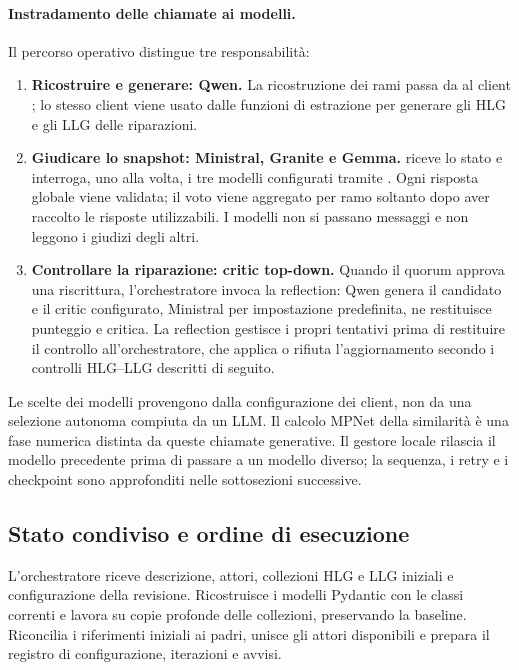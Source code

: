 \begin{samepage}
\paragraph{Instradamento delle chiamate ai modelli.}
Il percorso operativo distingue tre responsabilit\`a:
\begin{enumerate}
\item \textbf{Ricostruire e generare: Qwen.} La ricostruzione dei rami passa
da  al client
; lo stesso client viene usato dalle funzioni
di estrazione per generare gli HLG e gli LLG delle riparazioni.
\item \textbf{Giudicare lo snapshot: Ministral, Granite e Gemma.}
 riceve lo stato e interroga, uno alla
volta, i tre modelli configurati tramite .
Ogni risposta globale viene validata; il voto viene aggregato per ramo
soltanto dopo aver raccolto le risposte utilizzabili. I modelli non si
passano messaggi e non leggono i giudizi degli altri.
\item \textbf{Controllare la riparazione: critic top-down.}
Quando il quorum approva una riscrittura, l'orchestratore invoca la
reflection: Qwen genera il candidato e il critic configurato, Ministral
per impostazione predefinita, ne restituisce punteggio e critica.
La reflection gestisce i propri tentativi prima di restituire il controllo
all'orchestratore, che applica o rifiuta l'aggiornamento secondo i controlli
HLG--LLG descritti di seguito.
\end{enumerate}
\end{samepage}
Le scelte dei modelli provengono dalla configurazione dei client, non
da una selezione autonoma compiuta da un LLM. Il calcolo MPNet della
similarit\`a \`e una fase numerica distinta da queste chiamate generative.
Il gestore locale rilascia il modello precedente prima di passare a un
modello diverso; la sequenza, i retry e i checkpoint sono approfonditi
nelle sottosezioni successive.

\subsection{Stato condiviso e ordine di esecuzione}
L'orchestratore riceve descrizione, attori, collezioni HLG e LLG iniziali e
configurazione della revisione. Ricostruisce i modelli Pydantic con le classi
correnti e lavora su copie profonde delle collezioni, preservando la baseline.
Riconcilia i riferimenti iniziali ai padri, unisce gli attori disponibili e
prepara il registro di configurazione, iterazioni e avvisi.

